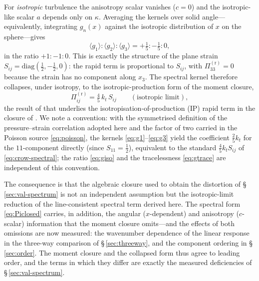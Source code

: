 \documentclass[lineno]{JFM-FLM_Au}
\begin{document}
For \emph{isotropic} turbulence the anisotropy scalar vanishes ($c=0$) and the
isotropic-like scalar $a$ depends only on $\kappa$. Averaging the kernels over
solid angle---equivalently, integrating $g_n(x)$ against the isotropic
distribution of $x$ on the sphere---gives
\begin{equation}
  \langle g_1\rangle : \langle g_2\rangle : \langle g_3\rangle
  = +\tfrac15 : -\tfrac15 : 0,
  \label{eq:giso}
\end{equation}
in the ratio $+1:-1:0$. This is exactly the structure of the plane strain
$S_{ij}=\mathrm{diag}(\tfrac12,-\tfrac12,0)$: the rapid term is proportional to
$S_{ij}$, with $\Pi^{(\mathrm r)}_{33}=0$ because the strain has no component
along $x_3$. The spectral kernel therefore collapses, under isotropy, to the
isotropic-production form of the moment closure,
\begin{equation}
  \Pi^{(\mathrm r)}_{ij}
  = \tfrac{4}{5}\,k_t\,S_{ij}
  \qquad(\text{isotropic limit}),
  \label{eq:crow-spectral}
\end{equation}
the result of \citet{Crow1968} that underlies the isotropisation-of-production
(IP) rapid term in the closure of \citet{LaunderReeceRodi1975}. We note a
convention: with the symmetrised definition of the pressure--strain correlation
adopted here and the factor of two carried in the Poisson source
\eqref{eq:poisson}, the kernels \eqref{eq:g1}--\eqref{eq:g3} yield the
coefficient $\tfrac25 k_t$ for the $11$-component directly (since $S_{11}=\tfrac12$),
equivalent to the standard $\tfrac45 k_t S_{ij}$ of \eqref{eq:crow-spectral}; the ratio
\eqref{eq:giso} and the tracelessness \eqref{eq:gtrace} are independent of this
convention.

The consequence is that the algebraic closure used to obtain the distortion of
\S\,\ref{sec:val-spectrum} is not an independent assumption but the
isotropic-limit reduction of the line-consistent spectral term derived here.
The spectral form \eqref{eq:Piclosed} carries, in addition, the angular
($x$-dependent) and anisotropy ($c$-scalar) information that the moment closure omits---and the effects of both omissions are now measured: the wavenumber dependence
of the linear response in the three-way comparison of
\S\,\ref{sec:threeway}, and the component ordering in
\S\,\ref{sec:order}. The moment closure and the collapsed form thus
agree to leading order, and the terms in which they differ are exactly
the measured deficiencies of \S\,\ref{sec:val-spectrum}.
\end{document}
